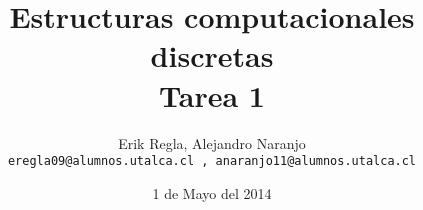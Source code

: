\documentclass[11pt]{utalcaDoc}
\title{{\bf Estructuras computacionales discretas}\\Tarea 1}
\author{Erik Regla, Alejandro Naranjo \\ \tt{eregla09@alumnos.utalca.cl} , \tt{anaranjo11@alumnos.utalca.cl}}
\date{1 de Mayo del 2014}
\numberwithin{equation}{section}
\begin{document}
\renewcommand{\figurename}{Figura~}
\renewcommand{\tablename}{Tabla~}

\maketitle

			\newpage
					\newpage
			\newpage
				\newpage
	\newpage
	\newpage

\end{document}

